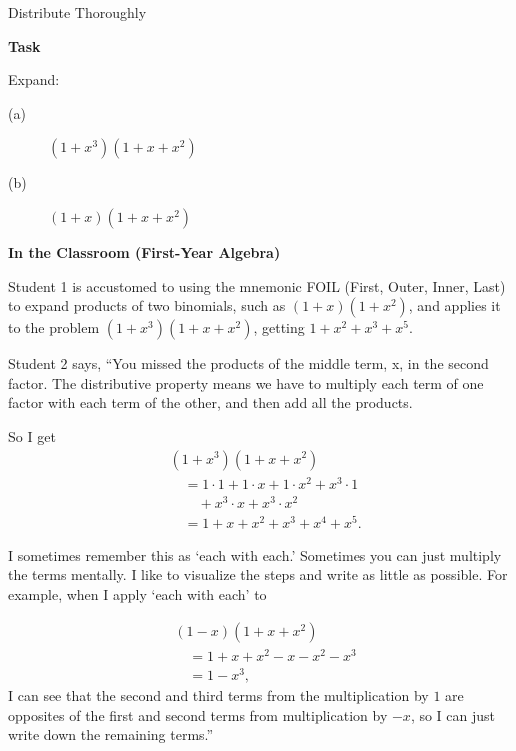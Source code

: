 \TriExample
  {Distribute Thoroughly}
  {
    \textbf{Task}

    Expand:

    \begin{description}
      \item [\normalfont (a)] $(1 + x^3)(1 + x + x^2)$
      \item [\normalfont (b)] $(1 + x)(1 + x + x^2)$
    \end{description}\vspace{.25\baselineskip}

    \textbf{In the Classroom (First-Year Algebra)}

    Student 1 is accustomed to using the mnemonic FOIL (First, Outer, Inner, Last) to expand products of two binomials, such as $(1 + x)(1 + x^2)$, and applies it to the problem $(1 + x^3)(1 + x + x^2)$, getting $1 + x^2 + x^3 + x^5$.\vspace{\baselineskip}

    Student 2 says, ``You missed the products of the middle term, x, in the second factor. The distributive property means we have to multiply each term of one factor with each term of the other, and then add all the products.

    So I get
    $$
    \begin{aligned}
      &(1 + x^3)(1 + x + x^2) \\
        &\quad= 1 \cdot 1 + 1 \cdot x + 1 \cdot x^2 + x^3 \cdot 1\\
        &\qquad + x^3 \cdot x + x^3 \cdot x^2 \\
        &\quad= 1 + x + x^2 + x^3 + x^4 + x^5.
    \end{aligned}
    $$

    I sometimes remember this as `each with each.' Sometimes you can just multiply the terms mentally. I like to visualize the steps and write as little as possible. For example, when I apply `each with each' to\vspace{\baselineskip}

    $$
    \begin{aligned}
      &(1 - x)(1 + x + x^2) \\
      &\quad = 1 + x + x^2 - x - x^2 - x^3 \\
      &\quad = 1 - x^3,
    \end{aligned}
    $$
    I can see that the second and third terms from the multiplication by $1$ are opposites of the first and second terms from multiplication by $-x$, so I can just write down the remaining terms.''

}
